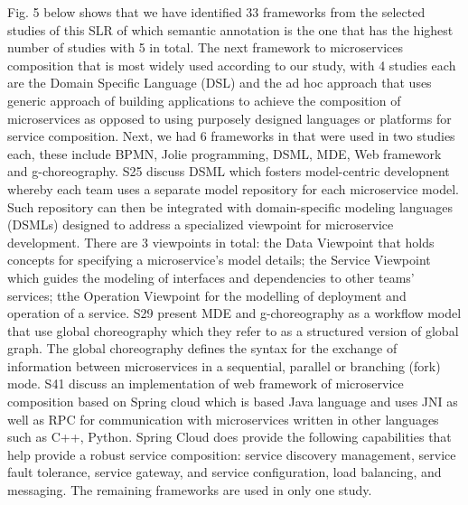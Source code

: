\documentclass{article}
\begin{document}
\begin{multicols}{2}
Fig. 5 below shows that we have identified 33 frameworks from the selected studies of this SLR of which semantic annotation is the one that has the highest number of studies with 5 in total. The next framework to microservices composition that is most widely used according to our study, with 4 studies each are the Domain Specific Language (DSL) and the ad hoc approach that uses generic approach of building applications to achieve the composition of microservices as opposed to using purposely designed languages or platforms for service composition. Next, we had 6 frameworks in that were used in two studies each, these include BPMN, Jolie programming, DSML, MDE, Web framework and g-choreography. S25 discuss DSML which fosters model-centric developnent whereby each team uses a separate model repository for each microservice model. Such repository can then be integrated with domain-specific modeling languages (DSMLs) designed to address  a specialized viewpoint for microservice development. There are 3 viewpoints in total: the Data Viewpoint that holds concepts for specifying a microservice’s model details; the Service Viewpoint which guides the modeling of interfaces and dependencies to other teams’ services; tthe Operation Viewpoint for the modelling of deployment and operation of a service.
S29 present MDE and g-choreography as a workflow model that use global choreography which they refer to as a structured version of global graph. The global choreography defines the syntax for the exchange of information between microservices in a sequential, parallel or branching (fork) mode. 
S41 discuss an implementation of web framework of microservice composition based on Spring cloud which is based Java language and uses 
JNI as well as RPC for communication with microservices written in other languages such as C++, Python. Spring Cloud does provide the following capabilities that help provide a robust service composition: service discovery management, service fault tolerance, service gateway, and service configuration, load balancing, and messaging. The remaining frameworks are used in only one study. 


\end{multicols}
\end{document}
